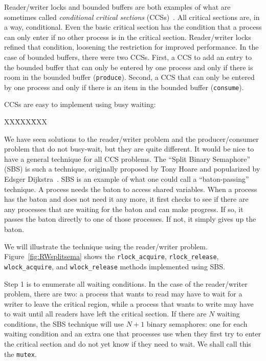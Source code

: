 \documentclass{report}
\newcommand{\cxlsource}[1]{
\begin{tabbing}
XX\=XXX\=XXX\kill
    
\end{tabbing}
}
\newenvironment{code}{
\tcolorbox
}{
\endtcolorbox
}
\begin{document}

Reader/writer locks and bounded buffers are both examples of what are
sometimes called \emph{conditional critical sections}
(CCSs)~\cite{Hoare73}.
All critical sections are, in a way, conditional.  Even the basic critical section
has the condition that a process can only enter if no other process
is in the critical section.  Reader/writer locks refined that condition, loosening
the restriction for improved performance.
In the case of bounded buffers, there were two CCSs.  First, a CCS
to add an entry to the bounded buffer that can only be entered by one
process and only if there is room in the bounded buffer (\texttt{produce}).
Second, a CCS that can only be entered by one process and
only if there is an item in the bounded buffer (\texttt{consume}).

CCSs are easy to implement using busy waiting:
\begin{code}
\cxlsource{busywait}
\end{code}

We have seen solutions to the reader/writer problem and the producer/consumer
problem that do not busy-wait, but they are quite different.  It would be nice
to have a general technique for all CCS problems.
The ``Split Binary Semaphore'' (SBS) is such a technique, originally proposed by
Tony Hoare and popularized by Edsger Dijkstra~\cite{EWD703}.
SBS is an example of what one could call a ``baton-passing'' technique.
A process needs the baton to access shared variables.
When a process has the baton and does not need it any more,
it first checks to see if there are any processes that are waiting for the
baton and can make progress.
If so, it passes the baton directly to one of those processes.
If not, it simply gives up the baton.

We will illustrate the technique using the reader/writer problem.
Figure~\ref{fig:RWsplitsema} shows the
\texttt{rlock\_acquire}, \texttt{rlock\_release},
\texttt{wlock\_acquire}, and \texttt{wlock\_release} methods implemented using
SBS.

Step 1 is to enumerate all waiting conditions.  In the case of the reader/writer
problem, there are two: a process that wants to read may have to wait for a
writer to leave the critical region, while a process that wants to write may
have to wait until all readers have left the critical section.  If there are $N$
waiting conditions, the SBS technique will use $N+1$ binary semaphores: one for
each waiting condition and an extra one that processes use when they first try
to enter the critical section and do not yet know if they need to wait.
We shall call this the \texttt{mutex}.
\end{document}
